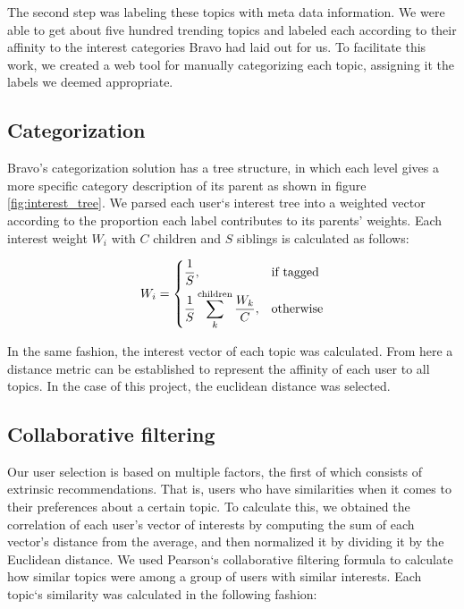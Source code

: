 \documentclass[journal]{IEEEtran}
\begin{document}
The second step was labeling these topics with meta data information. We
were able to get about five hundred trending topics and labeled each 
according to their affinity to the interest categories Bravo had laid
out for us. To facilitate this work, we created a web tool for manually
categorizing each topic, assigning it the labels we deemed appropriate.

\subsection{Categorization}

Bravo's categorization solution has a tree structure, in which each
level gives a more specific category description of its parent as shown
in figure \ref{fig:interest_tree}. We parsed each user`s interest tree
into a weighted vector according to the proportion each label
contributes to its parents' weights. Each interest weight \(W_i\) with
\(C\) children and \(S\) siblings is calculated as follows:

\[
    W_i = 
    \begin{dcases}
        \frac{1}{S},
                & \text{if tagged}\\
        \frac{1}{S} \sum_{k}^{\text{children}}\frac{W_k}{C},
                & \text{otherwise}
    \end{dcases}
\]

In the same fashion, the interest vector of each topic was calculated. 
From here a distance metric can be established to represent the affinity
of each user to all topics. In the case of this project, the euclidean
distance was selected.

\subsection{Collaborative filtering}

Our user selection is based on multiple factors, the first of which
consists of extrinsic recommendations. That is, users who have
similarities when it comes to their preferences about a certain topic.
To calculate this, we obtained the correlation of each user’s vector of
interests by computing the sum of each vector’s distance from the
average, and then normalized it by dividing it by the Euclidean
distance. We used Pearson`s collaborative filtering formula to calculate
how similar topics were among a group of users with similar interests. 
Each topic`s similarity was calculated in the following fashion: 
\end{document}
